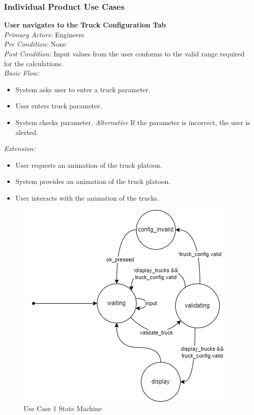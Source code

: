 \documentclass[12pt]{article}
\begin{document}
\subsubsection{Individual Product Use Cases}


\noindent
\textbf{User navigates to the Truck Configuration Tab} \\
\emph{  Primary Actors:} Engineers\\
\emph{  Pre Condition:} None\\
\emph{  Post Condition:} Input values from the user conforms to the valid range required for the calculations.\\ 
\emph{  Basic Flow:} 
\begin{itemize}
\item System asks user to enter a truck parameter.
\item User enters truck parameter.
\item System checks parameter.
\subitem \emph{Alternative} If the parameter is incorrect, the user is alerted.
\end{itemize}
\emph{  Extension:}
\begin{itemize}
\item User requests an animation of the truck platoon.
\item System provides an animation of the truck platoon.
\item User interacts with the animation of the trucks. 
\end{itemize}
\begin{figure}[H]
  \centering
  \includegraphics[width=0.5\linewidth]{use-case-1-sm.png}
  \caption{Use Case 1 State Machine}
  \label {fig:use-case-1-sm}
\end{figure}
\end{document}

